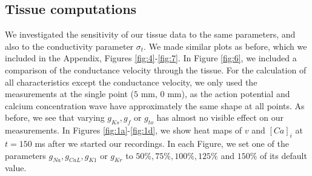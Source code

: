 \documentclass{article}
\begin{document}
\subsection{Tissue computations} \label{Tissue computations}
We investigated the sensitivity of our tissue data to the same parameters, and also to the conductivity parameter $\sigma_t$. We made similar plots as before, which we included in the Appendix, Figures \ref{fig:4}-\ref{fig:7}. In Figure \ref{fig:6}, we included a comparison of the conductance velocity through the tissue. For the calculation of all characteristics except the conductance velocity, we only used the measurements at the single point ($5$ mm, $0$ mm), as the action potential and calcium concentration wave have approximately the same shape at all points. As before, we see that varying $g_{Ks}, g_{f}$ or $g_{to}$ has almost no visible effect on our measurements.  In Figures  \ref{fig:1a}-\ref{fig:1d}, we show heat maps of $v$ and $[Ca]_i$ at $t=150$ ms after we started our recordings. In each Figure, we set one of the parameters $g_{Na}, g_{CaL}, g_{K1}$ or $g_{Kr}$ to $50\%, 75\%, 100\%, 125\%$ and $150\%$ of its default value.
%
\end{document}
